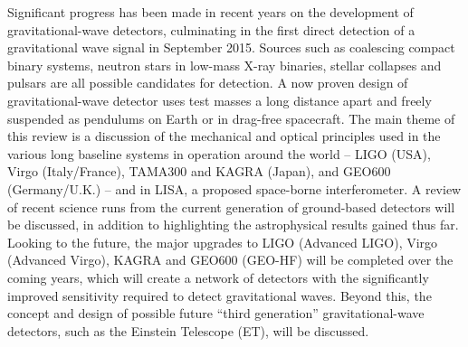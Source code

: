 Significant progress has been made in recent years on the development of
gravitational-wave detectors, culminating in the first direct detection of
a gravitational wave signal in September 2015. Sources such as coalescing compact binary
systems, neutron stars in low-mass X-ray binaries, stellar collapses and
pulsars are all possible candidates for detection. A now proven design
of gravitational-wave detector uses test masses a long distance apart and
freely suspended as pendulums on Earth or in drag-free spacecraft.  The
main theme of this review is a discussion of the mechanical and optical
principles used in the various long baseline systems in operation around the
world -- LIGO (USA), Virgo (Italy/France), TAMA300 and KAGRA (Japan), and
GEO600 (Germany/U.K.) -- and in LISA, a proposed space-borne interferometer. A
review of recent science runs from the current generation of ground-based
detectors will be discussed, in addition to highlighting the astrophysical
results gained thus far. Looking to the future, the major upgrades to LIGO
(Advanced LIGO), Virgo (Advanced Virgo), KAGRA and GEO600 (GEO-HF) will be
completed over the coming years, which will create a network of detectors
with the significantly improved sensitivity required to detect
gravitational waves. Beyond this, the concept and design of possible
future ``third generation'' gravitational-wave detectors, such as the
Einstein Telescope (ET), will be discussed.
  
  